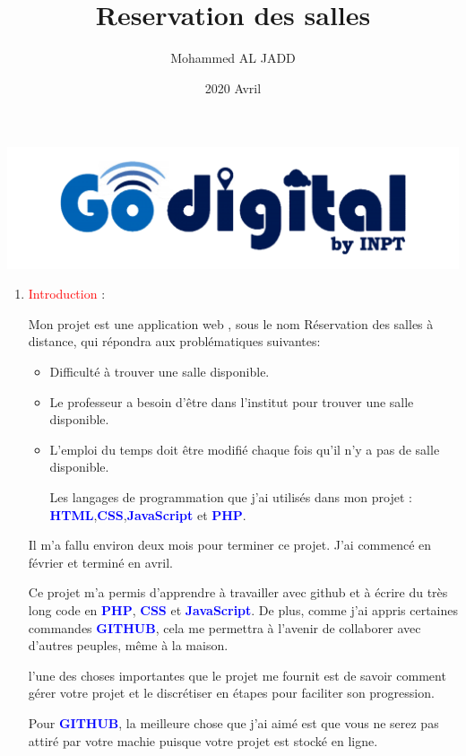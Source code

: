 \documentclass{article}
\title{Reservation des salles}
\author{Mohammed AL JADD}
\date{2020 Avril}
\begin{document}
\maketitle

    



\includegraphics[width=\textwidth]{img/Go.png}

\begin{enumerate}
    
     \item  \textcolor{red}{\huge Introduction} : 
     \vspace{1cm}
 
   \setlength{\parindent}{1cm} Mon projet est une application web , sous le nom Réservation des salles à distance, qui répondra aux problématiques suivantes:
   \vspace{0.3cm}
   \begin{itemize}
     
        \item Difficulté à trouver une salle disponible.
        \item Le professeur a besoin d'être dans l'institut pour trouver une salle disponible.
        \item L'emploi du temps doit être modifié chaque fois qu'il n'y a pas de salle disponible.
        
            Les langages de programmation que j'ai utilisés dans mon projet : \textcolor{blue}{ \textbf{HTML}},\textcolor{blue}{\textbf{CSS}},\textcolor{blue}{\textbf{JavaScript}} et \textcolor{blue}{\textbf{PHP}}.
   \end{itemize}
   \vspace{0.3cm}
   
  \setlength{\parindent}{1cm} Il m'a fallu environ deux mois pour terminer ce projet. J'ai commencé en février et terminé en avril.\par \vspace{0.3cm} \setlength{\parindent}{1cm}  Ce projet m'a permis d'apprendre à travailler avec github et à écrire du très long code  en \textcolor{blue}{\textbf{PHP}}, \textcolor{blue}{\textbf{CSS}} et \textcolor{blue}{\textbf{JavaScript}}. De plus, comme j'ai appris certaines commandes \textcolor{blue}{\textbf{GITHUB}}, cela me permettra à l'avenir de collaborer avec d'autres peuples, même à la maison.\par \vspace{0.3cm} l'une des choses importantes que le projet me fournit est de savoir comment gérer votre projet et le discrétiser en étapes pour faciliter son progression.\par \vspace{0.3cm} Pour \textcolor{blue}{\textbf{GITHUB}}, la meilleure chose que j'ai aimé est que vous ne serez pas attiré par votre machie puisque votre projet est stocké en ligne.
   

\end{enumerate}
\end{document}
